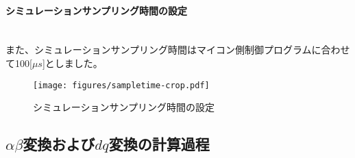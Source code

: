 \paragraph{シミュレーションサンプリング時間の設定}\mbox{}\\
また、シミュレーションサンプリング時間はマイコン側制御プログラムに合わせて100[$\mu s$]としました。
\begin{figure}[htbp!]
    \begin{center}
        \texttt{[image: figures/sampletime-crop.pdf]}
    \end{center}
\caption{シミュレーションサンプリング時間の設定}
\label{sampling}
\end{figure}

\newpage
\subsection{$\alpha \beta$変換および$dq$変換の計算過程}
\label{eq-doshutsu}

